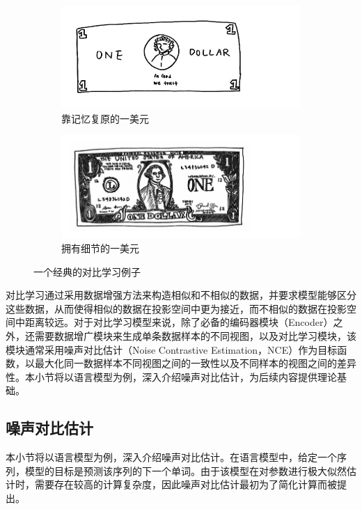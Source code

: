 \begin{figure}[!h]
    \centering
    \begin{subfigure}{0.49\linewidth}
        \centering
        \includegraphics[width=.88\linewidth]{figure/Inline-rough.jpg}
        \caption{靠记忆复原的一美元}
        \label{fig:rough}
    \end{subfigure}
    \begin{subfigure}{0.49\linewidth}
        \centering
        \includegraphics[width=.88\linewidth]{figure/Inline-Detailed.jpg}
        \caption{拥有细节的一美元}
        \label{fig:detailed}
    \end{subfigure}
    \caption{一个经典的对比学习例子}
    \label{tag:dollar}
\end{figure}

对比学习通过采用数据增强方法来构造相似和不相似的数据，并要求模型能够区分这些数据，从而使得相似的数据在投影空间中更为接近，而不相似的数据在投影空间中距离较远。对于对比学习模型来说，除了必备的编码器模块（Encoder）之外，还需要数据增广模块来生成单条数据样本的不同视图，以及对比学习模块，该模块通常采用噪声对比估计（Noise Contrastive Estimation，NCE）作为目标函数，以最大化同一数据样本不同视图之间的一致性以及不同样本的视图之间的差异性。本小节将以语言模型为例，深入介绍噪声对比估计，为后续内容提供理论基础。


\subsection{噪声对比估计}
本小节将以语言模型为例，深入介绍噪声对比估计。在语言模型中，给定一个序列，模型的目标是预测该序列的下一个单词。由于该模型在对参数进行极大似然估计时，需要存在较高的计算复杂度，因此噪声对比估计最初为了简化计算而被提出。
